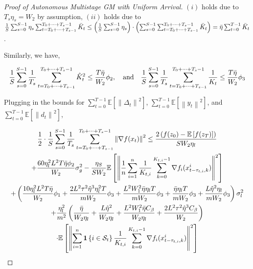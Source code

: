 \begin{proof}[Proof of Autonomous Multistage GM with Uniform Arrival]
$(i)$ holds due to $T_s\eta_s=W_2$ by assumption, $(ii)$ holds due to $\frac{1}{S}\sum_{s=0}^{S-1} \eta_s \sum_{t=T_0+\dots+T_{s-1} }^{T_0+\dots+T_s-1} \Bar{K}_t\leq\left(\frac{1}{S}\sum_{s=0}^{S-1} \eta_s\right)\cdot\left(\sum_{s=0}^{S-1}\sum_{t=T_0+\dots+T_{s-1} }^{T_0+\dots+T_s-1} \Bar{K}_t\right)=\Bar{\eta}\sum_{t=0}^{T-1}\Bar{K}_t$.

Similarly, we have,

\begin{equation}
\begin{gathered}
\frac{1}{S}\sum_{s=0}^{S-1} \frac{1}{T_s}\sum_{t=T_0+\dots+T_{s-1} }^{T_0+\dots+T_s-1} \hat{K}^2_t \leq \frac{T \Bar{\eta}}{W_2} \phi_2,  \quad \text{and} \quad
\frac{1}{S}\sum_{s=0}^{S-1} \frac{1}{T_s}\sum_{t=T_0+\dots+T_{s-1} }^{T_0+\dots+T_s-1} \frac{1}{K_t} \leq \frac{T \Bar{\eta}}{W_2} \phi_3
\end{gathered}\nonumber
\end{equation}

Plugging in the bounds for $\sum_{t=0}^{T-1}\mathbb{E}\left[\left\| \Delta_t\right\|^2\right]$, $\sum_{t=0}^{T-1}\mathbb{E}\left[\left\| y_t\right\|^2\right]$, and $\sum_{t=0}^{T-1}\mathbb{E}\left[\left\| d_t\right\|^2\right]$,

\begin{equation}
\begin{gathered}
\frac{1}{2} \cdot \frac{1}{S}\sum_{s=0}^{S-1} \frac{1}{T_s}\sum_{t=T_0+\dots+T_{s-1} }^{T_0+\dots+T_s-1} \left\|\nabla f(x_t)\right\|^2
\leq \frac{2\left(f(z_0) - \mathbb{E}\left[f(z_{T})\right]  \right)}{S W_2 \eta_l} \\
+ \frac{60 \eta^2_l L^2 T \Bar{\eta} \phi_2}{W_2} \sigma_g^2 - \frac{\eta_S}{S W_2} \mathbb{E}\left[\left\| \frac{1}{n}\sum_{i=1}^n \frac{1}{K_{t,i}} \sum_{k=0}^{K_{t,i}-1} \nabla f_i(x_{t-\tau_{t,i},k}^i) \right\|^2\right]\\
+ \left( \frac{10  \eta^2_l L^2 T \Bar{\eta}}{W_2} \phi_1 + \frac{2L^2\tau^2\hat{\eta}^3\eta_l^2T}{mW_2}\phi_3 + \frac{L^2W_1^2 \Bar{\eta} \eta_l T}{m W_2}\phi_3 + \frac{\Bar{\eta} \eta_l T}{m W_2}\phi_3 + \frac{L\hat{\eta}^2\eta_l}{m W_2}\phi_3 \right)  \sigma_l^2 \\
+ \frac{\eta_l^2}{m^2}\left(\frac{\Bar{\eta}}{W_2\eta_l}+\frac{L\hat{\eta}^2}{W_2\eta_l}+\frac{L^2W_1^2\Bar{\eta}C_\beta}{W_2\eta_l}+\frac{2L^2\tau^2\hat{\eta}^3C_\beta}{W_2}\right) \\
\cdot \mathbb{E}\left[\left\| \sum_{i=1}^n\mathbf{1}\left\{i\in\mathcal{S}_t\right\} \frac{1}{K_{t,i}} \sum_{k=0}^{K_{t,i}-1}  \nabla f_i(x_{t-\tau_{t,i},k}^i) \right\|^2\right] 
\end{gathered}\nonumber
\end{equation}



\end{proof}

